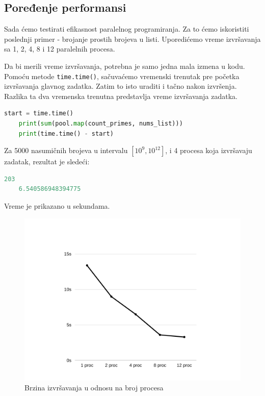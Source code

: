 \documentclass[a4paper]{article}
\begin{document}
    \subsection{Poređenje performansi}
    Sada ćemo testirati efikasnost paralelnog programiranja. Za to ćemo iskoristiti poslednji primer - brojanje prostih brojeva u listi. Uporedićemo vreme izvršavanja sa 1, 2, 4, 8 i 12 paralelnih procesa.
    \par Da bi merili vreme izvršavanja, potrebna je samo jedna mala izmena u kodu. Pomoću metode \lstinline{time.time()}, sačuvaćemo vremenski trenutak pre početka izvršavanja glavnog zadatka. Zatim to isto uraditi i tačno nakon izvršenja. Razlika ta dva vremenska trenutna predstavlja vreme izvršavanja zadatka.
    \begin{lstlisting}[showstringspaces=false, language=Python]
    start = time.time()
    print(sum(pool.map(count_primes, nums_list)))
    print(time.time() - start)
    \end{lstlisting}
    Za 5000 nasumičnih brojeva u intervalu $\left [ 10^{9}, 10^{12} \right ]$, i 4 procesa koja izvršavaju zadatak, rezultat je sledeći:
    \begin{lstlisting}[showstringspaces=false, language=Python]
    203
    6.540586948394775
    \end{lstlisting}
    \par Vreme je prikazano u sekundama. \\
  
    \begin{figure}[ht!]
    \begin{center}
    \includegraphics[scale=0.3,natwidth=1024,natheight=768]{grafik.png}
    \end{center}
    \caption{Brzina izvršavanja u odnosu na broj procesa}
    \label{fig:grafik}
    \end{figure}
    
\end{document}
